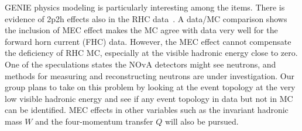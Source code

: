 \documentclass[a4paper, 11pt]{article} %
\begin{document}
GENIE physics modeling is particularly interesting among the items. There is evidence of 2p2h effects also in the RHC data~\cite{Bashar:2016_1}. A data/MC comparison shows the inclusion of MEC effect makes the MC agree with data very well for the forward horn current (FHC) data. However, the MEC effect cannot compensate the deficiency of RHC MC, especially at the visible hadronic energy close to zero. One of the speculations states the NOvA detectors might see neutrons, and methods for measuring and reconstructing neutrons are under investigation. Our group plans to take on this problem by looking at the event topology at the very low visible hadronic energy and see if any event topology in data but not in MC can be identified. MEC effects in other variables such as the invariant hadronic mass $W$ and the four-momentum transfer $Q$ will also be pursued.\newline
\end{document}
